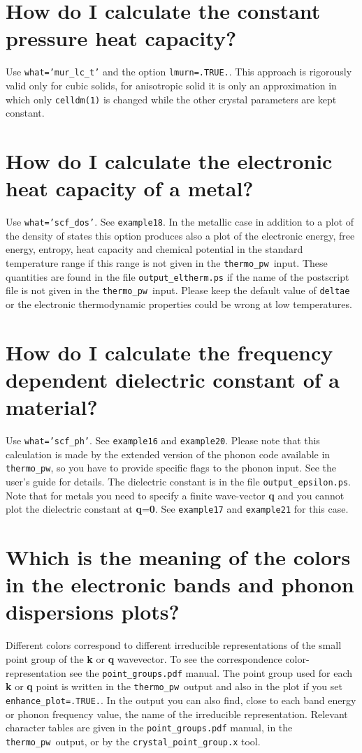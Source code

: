 \documentclass[12pt,a4paper]{article}
\def\thermo{\texttt{thermo\_pw}}
\begin{document}
\section{\color{coral} How do I calculate the constant pressure heat capacity?}
Use \texttt{what='mur\_lc\_t'} and the option \texttt{lmurn=.TRUE.}.
This approach is rigorously valid only for cubic solids, for anisotropic
solid it is only an approximation in which only \texttt{celldm(1)} is
changed while the other crystal parameters are kept constant.

\section{\color{coral} How do I calculate the electronic heat capacity
of a metal?}
Use \texttt{what='scf\_dos'}. See \texttt{example18}. In the metallic
case in addition to a plot of the density of states this option produces
also a plot of the electronic energy, free energy, entropy, heat capacity
and chemical potential in the standard temperature range if this range is
not given in the \thermo\ input. These quantities are found in the file
\texttt{output\_eltherm.ps} if the name of the postscript
file is not given in the \thermo\ input.
Please keep the default value of \texttt{deltae} or the electronic
thermodynamic properties could be wrong at low temperatures.

\section{\color{coral} How do I calculate the frequency dependent dielectric
constant of a material?}
Use \texttt{what='scf\_ph'}. See \texttt{example16} and \texttt{example20}. 
Please note that this calculation is made by the extended version of the
phonon code available in \thermo, so you have to provide specific flags
to the phonon input. See the user's guide for details. 
The dielectric constant is in the file \texttt{output\_epsilon.ps}.
Note that for metals you need to specify a finite wave-vector {\bf q} and you 
cannot plot the dielectric constant at {\bf q}={\bf 0}.  
See \texttt{example17} and \texttt{example21} for this case. 

\section{\color{coral} Which is the meaning of the colors in
the electronic bands and phonon dispersions plots?}
Different colors correspond to different irreducible representations of 
the small point group of the {\bf k} or {\bf q} wavevector. To see the
correspondence color-representation see the \texttt{point\_groups.pdf} 
manual. The point group used for each {\bf k} or {\bf q} point is
written in the \thermo\ output and also in the plot if you set
\texttt{enhance\_plot=.TRUE.}. In the output you can also find,
close to each band energy or phonon frequency value, the name of the
irreducible representation. Relevant character tables are given in the
\texttt{point\_groups.pdf} manual, in the \thermo\ output, or by the
\texttt{crystal\_point\_group.x} tool.
\end{document}

